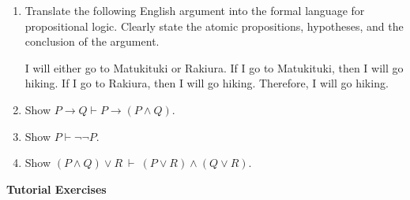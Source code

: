 \documentclass[11pt]{report}
\begin{document}
\begin{enumerate}

	\item Translate the following English argument into the formal language for propositional logic. Clearly state the atomic propositions, hypotheses, and the conclusion of the argument. 
		
	\vspace{0.5cm}

	I will either go to Matukituki or Rakiura. If I go to Matukituki, then I will go hiking. If I go to Rakiura, then I will go hiking. Therefore, I will go hiking. 

	\vspace{3cm}

	\item Show $ P\rightarrow  Q \vdash  P\rightarrow ( P\land  Q)$.

	\vspace{3cm}

	\item Show $ P\vdash \lnot \lnot  P$.

	\vspace{3cm}

	\item Show $( P\land  Q) \lor  R \ \vdash \ ( P\lor  R) \land ( Q \lor  R)$.

\end{enumerate}

\newpage
{\bf Tutorial Exercises}
\end{document}
